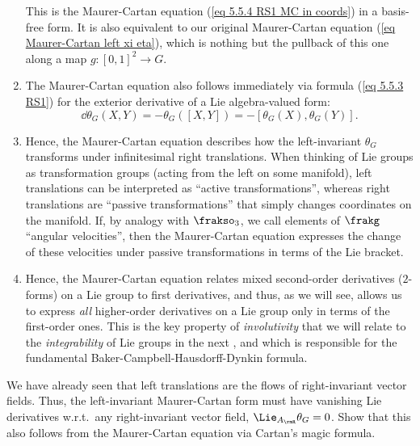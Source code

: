 \begin{rem}
\begin{enumerate}
        This is the Maurer-Cartan equation (\ref{eq 5.5.4 RS1 MC in coords}) in a basis-free form. It is also equivalent to our original Maurer-Cartan equation (\ref{eq Maurer-Cartan left xi eta}), which is nothing but the pullback of this one along a map $g:[0,1]^2\to G$.
        \item The Maurer-Cartan equation also follows immediately via formula (\ref{eq 5.5.3 RS1}) for the exterior derivative of a Lie algebra-valued form:
        \[\dd\theta_G(X,Y)=-\theta_G([X,Y])=-[\theta_G(X),\theta_G(Y)].\]
        \item Hence, the Maurer-Cartan equation describes how the left-invariant $\theta_G$ transforms under infinitesimal right translations. When thinking of Lie groups as transformation groups (acting from the left on some manifold), left translations can be interpreted as ``active transformations'', whereas right translations are ``passive transformations'' that simply changes coordinates on the manifold. If, by analogy with $\frakso_3$, we call elements of $\frakg$ ``angular velocities'', then the Maurer-Cartan equation expresses the change of these velocities under passive transformations in terms of the Lie bracket.
        \item Hence, the Maurer-Cartan equation relates mixed second-order derivatives ($2$-forms) on a Lie group to first derivatives, and thus, as we will see, allows us to express \emph{all} higher-order derivatives on a Lie group only in terms of the first-order ones. This is the key property of \emph{involutivity} that we will relate to the \emph{integrability} of Lie groups in the next \sect, and which is responsible for the fundamental Baker-Campbell-Hausdorff-Dynkin formula.
    \end{enumerate}
\end{rem}

\begin{xca}
    We have already seen that left translations are the flows of right-invariant vector fields. Thus, the left-invariant Maurer-Cartan form must have vanishing Lie derivatives w.r.t.\ any right-invariant vector field, $\Lie_{A_\rmR}\theta_G=0$. Show that this also follows from the Maurer-Cartan equation via Cartan's magic formula.
\end{xca}


